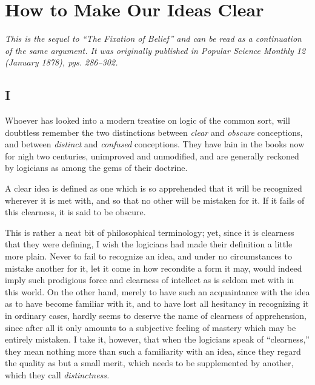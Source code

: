 
\section*{How to Make Our Ideas Clear}
\emph{This is the sequel to ``The Fixation of Belief'' and can be read as a continuation of the same argument. It was originally published in \emph{Popular Science Monthly} 12 (January 1878), pgs. 286--302.}

\subsection*{I}

Whoever has looked into a modern treatise on logic of the common sort, will doubtless remember the two distinctions between \emph{clear} and \emph{obscure} conceptions, and between \emph{distinct} and \emph{confused} conceptions. They have lain in the books now for nigh two centuries, unimproved and unmodified, and are generally reckoned by logicians as among the gems of their doctrine.


A clear idea is defined as one which is so apprehended that it will be recognized wherever it is met with, and so that no other will be mistaken for it. If it fails of this clearness, it is said to be obscure.


This is rather a neat bit of philosophical terminology; yet, since it is clearness that they were defining, I wish the logicians had made their definition a little more plain. Never to fail to recognize an idea, and under no circumstances to mistake another for it, let it come in how recondite a form it may, would indeed imply such prodigious force and clearness of intellect as is seldom met with in this world. On the other hand, merely to have such an acquaintance with the idea as to have become familiar with it, and to have lost all hesitancy in recognizing it in ordinary cases, hardly seems to deserve the name of clearness of apprehension, since after all it only amounts to a subjective feeling of mastery which may be entirely mistaken. I take it, however, that when the logicians speak of ``clearness,'' they mean nothing more than such a familiarity with an idea, since they regard the quality as but a small merit, which needs to be supplemented by another, which they call \emph{distinctness.}

